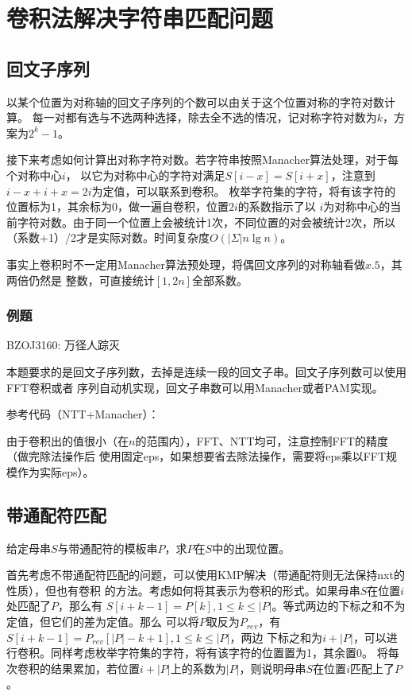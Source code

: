 \section{卷积法解决字符串匹配问题}
\subsection{回文子序列}
以某个位置为对称轴的回文子序列的个数可以由关于这个位置对称的字符对数计算。
每一对都有选与不选两种选择，除去全不选的情况，记对称字符对数为$k$，方案为$2^k-1$。

接下来考虑如何计算出对称字符对数。若字符串按照Manacher算法处理，对于每个对称中心$i$，
以它为对称中心的字符对满足$S[i-x]=S[i+x]$，注意到$i-x+i+x=2i$为定值，可以联系到卷积。
枚举字符集的字符，将有该字符的位置标为1，其余标为0，做一遍自卷积，位置$2i$的系数指示了以
$i$为对称中心的当前字符对数。由于同一个位置上会被统计1次，不同位置的对会被统计2次，所以
（系数+1）/2才是实际对数。时间复杂度$O(|\Sigma|n\lg n)$。

事实上卷积时不一定用Manacher算法预处理，将偶回文序列的对称轴看做$x.5$，其两倍仍然是
整数，可直接统计$[1,2n]$全部系数。

\subsubsection{例题} BZOJ3160: 万径人踪灭

本题要求的是回文子序列数，去掉是连续一段的回文子串。回文子序列数可以使用FFT卷积或者
序列自动机实现，回文子串数可以用Manacher或者PAM实现。

参考代码（NTT+Manacher）：


由于卷积出的值很小（在$n$的范围内），FFT、NTT均可，注意控制FFT的精度（做完除法操作后
使用固定eps，如果想要省去除法操作，需要将eps乘以FFT规模作为实际eps）。
\subsection{带通配符匹配}
给定母串$S$与带通配符的模板串$P$，求$P$在$S$中的出现位置。

首先考虑不带通配符匹配的问题，可以使用KMP解决（带通配符则无法保持nxt的性质），但也有卷积
的方法。考虑如何将其表示为卷积的形式。如果母串$S$在位置$i$处匹配了$P$，那么有
$S[i+k-1]=P[k],1\leq k \leq|P|$。等式两边的下标之和不为定值，但它们的差为定值。那么
可以将$P$取反为$P_{rev}$，有$S[i+k-1]=P_{rev}[|P|-k+1],1\leq k \leq |P|$，两边
下标之和为$i+|P|$，可以进行卷积。同样考虑枚举字符集的字符，将有该字符的位置置为1，其余置0。
将每次卷积的结果累加，若位置$i+|P|$上的系数为$|P|$，则说明母串$S$在位置$i$匹配上了$P$。

